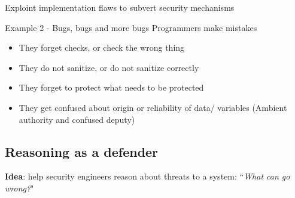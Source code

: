 \begin{parag}{Exploint implementation flaws to subvert security mechanisms}
    
	\begin{subparag}{Example 2 - Bugs, bugs and more bugs}
	    Programmers make mistakes
		\begin{itemize}
		    \item They forget checks, or check the wrong thing
		    \item They do not sanitize, or do not sanitize correctly
		    \item They forget to protect what needs to be protected
		    \item They get confused about origin or reliability of data/ variables (Ambient authority and confused deputy)
		\end{itemize}
		
	\end{subparag}
\end{parag}




\subsection{Reasoning as a defender}

\begin{center}
    \textbf{Idea}: help security engineers reason about threats to a system: “\textit{What can go wrong?}"
\end{center}


